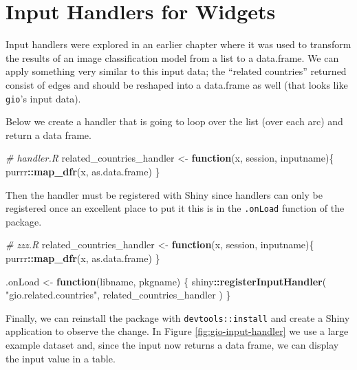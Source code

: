 \documentclass[10pt,]{krantz}
\makeatletter
\newenvironment{Shaded}{\begin{snugshade}}{\end{snugshade}}
\newcommand{\CommentTok}[1]{\textcolor[rgb]{0.37,0.37,0.37}{\textit{#1}}}
\newcommand{\ControlFlowTok}[1]{\textcolor[rgb]{0.27,0.27,0.27}{\textbf{#1}}}
\newcommand{\KeywordTok}[1]{\textcolor[rgb]{0.27,0.27,0.27}{\textbf{#1}}}
\newcommand{\NormalTok}[1]{#1}
\newcommand{\OperatorTok}[1]{\textcolor[rgb]{0.43,0.43,0.43}{\textbf{#1}}}
\newcommand{\StringTok}[1]{\textcolor[rgb]{0.5,0.5,0.5}{#1}}
\newenvironment{kframe}{%
\medskip{}
\setlength{\fboxsep}{.8em}
 \def\at@end@of@kframe{}%
 \ifinner\ifhmode%
  \def\at@end@of@kframe{\end{minipage}}%
  \begin{minipage}{\columnwidth}%
 \fi\fi%
 \def\FrameCommand##1{\hskip\@totalleftmargin \hskip-\fboxsep
 \colorbox{shadecolor}{##1}\hskip-\fboxsep
     \hskip-\linewidth \hskip-\@totalleftmargin \hskip\columnwidth}%
 \MakeFramed {\advance\hsize-\width
   \@totalleftmargin\z@ \linewidth\hsize
   \@setminipage}}%
 {\par\unskip\endMakeFramed%
 \at@end@of@kframe}
\renewenvironment{Shaded}{\begin{kframe}}{\end{kframe}}
\makeatother
\begin{document}
\hypertarget{shiny-widgets-handlers}{%
\section{Input Handlers for Widgets}\label{shiny-widgets-handlers}}

Input handlers were explored in an earlier chapter where it was used to transform the results of an image classification model from a list to a data.frame. We can apply something very similar to this input data; the ``related countries'' returned consist of edges and should be reshaped into a data.frame as well (that looks like \texttt{gio}'s input data).

Below we create a handler that is going to loop over the list (over each arc) and return a data frame.

\begin{Shaded}
\begin{Highlighting}[]
\CommentTok{# handler.R}
\NormalTok{related_countries_handler <-}\StringTok{ }\ControlFlowTok{function}\NormalTok{(x, session, inputname)\{}
\NormalTok{  purrr}\OperatorTok{::}\KeywordTok{map_dfr}\NormalTok{(x, as.data.frame)}
\NormalTok{\}}
\end{Highlighting}
\end{Shaded}

Then the handler must be registered with Shiny since handlers can only be registered once an excellent place to put it this is in the \texttt{.onLoad} function of the package.

\begin{Shaded}
\begin{Highlighting}[]
\CommentTok{# zzz.R}
\NormalTok{related_countries_handler <-}\StringTok{ }\ControlFlowTok{function}\NormalTok{(x, session, inputname)\{}
\NormalTok{  purrr}\OperatorTok{::}\KeywordTok{map_dfr}\NormalTok{(x, as.data.frame)}
\NormalTok{\}}

\NormalTok{.onLoad <-}\StringTok{ }\ControlFlowTok{function}\NormalTok{(libname, pkgname) \{}
\NormalTok{  shiny}\OperatorTok{::}\KeywordTok{registerInputHandler}\NormalTok{(}
    \StringTok{"gio.related.countries"}\NormalTok{, }
\NormalTok{    related_countries_handler}
\NormalTok{  )}
\NormalTok{\}}
\end{Highlighting}
\end{Shaded}

Finally, we can reinstall the package with \texttt{devtools::install} and create a Shiny application to observe the change. In Figure \ref{fig:gio-input-handler} we use a large example dataset and, since the input now returns a data frame, we can display the input value in a table.
\end{document}
